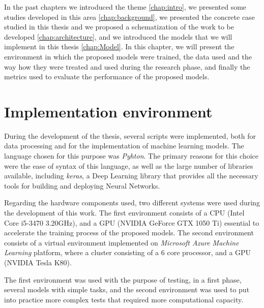 \cleardoublepage
\label{chap:implementation}

In the past chapters we introduced the theme \ref{chap:intro}, we presented some studies developed in this area \ref{chap:background}, we presented the concrete case studied in this thesis and we proposed a schematization of the work to be developed \ref{chap:architecture}, and we introduced the models that we will implement in this thesis \ref{chap:Model}.
In this chapter, we will present the environment in which the proposed models were trained, the data used and the way how they were treated and used during the research phase, and finally the metrics used to evaluate the performance of the proposed models.
 

\section{Implementation environment} \label{chap5:enviromnet}

During the development of the thesis, several scripts were implemented, both for data processing and for the implementation of machine learning models. The language chosen for this purpose was \textit{Pyhton}. The primary reasons for this choice were the ease of syntax of this language, as well as the large number of libraries available, including \textit{keras}, a Deep Learning library that provides all the necessary tools for building and deploying Neural Networks.

Regarding the hardware components used, two different systems were used during the development of this work. The first environment consists of a CPU (Intel Core i5-3470 3.20GHz), and a GPU (NVIDIA GeForce GTX 1050 Ti) essential to accelerate the training process of the proposed models. The second environment consists of a virtual environment implemented on \textit{Microsoft Azure Machine Learning} platform, where a cluster consisting of a 6 core processor, and a GPU (NVIDIA Tesla K80).

The first environment was used with the purpose of testing, in a first phase, several models with simple tasks, and the second environment was used to put into practice more complex tests that required more computational capacity.
	

